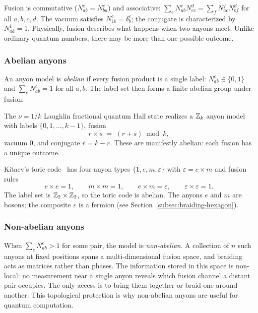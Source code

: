 \noindent
Fusion is commutative ($N^c_{ab} = N^c_{ba}$) and associative:
$\sum_e N^e_{ab} N^d_{ec} = \sum_f N^f_{ac} N^d_{bf}$ for all $a,b,c,d$.
The vacuum satisfies $N^c_{1b} = \delta^c_b$; the conjugate is characterized
by $N^1_{a\bar{a}} = 1$.  Physically, fusion describes what happens when two
anyons meet.  Unlike ordinary quantum numbers, there may be more than one
possible outcome.

\subsubsection*{Abelian anyons}

An anyon model is \emph{abelian} if every fusion product is a single label:
$N^c_{ab} \in \{0,1\}$ and $\sum_c N^c_{ab} = 1$ for all $a,b$.
The label set then forms a finite abelian group under fusion.

\begin{example}
\label{ex:zk-anyons}
The $\nu = 1/k$ Laughlin fractional quantum Hall state realizes a $\mathbb{Z}_k$ anyon
model with labels $\{0, 1, \ldots, k-1\}$, fusion
\begin{equation}
\label{eq:zk-fusion}
    r \times s \;=\; (r + s) \bmod k,
\end{equation}
vacuum $0$, and conjugate $\bar{r} = k - r$.  These are manifestly abelian:
each fusion has a unique outcome.
\end{example}

\begin{example}
\label{ex:toric-code-anyons}
Kitaev's toric code~\cite{Kitaev2003FaultTolerant} has four anyon types
$\{1, e, m, \varepsilon\}$ with $\varepsilon = e \times m$ and fusion rules
\begin{equation}
\label{eq:toric-fusion}
    e \times e = 1, \qquad m \times m = 1, \qquad e \times m = \varepsilon,
    \qquad \varepsilon \times \varepsilon = 1.
\end{equation}
The label set is $\mathbb{Z}_2 \times \mathbb{Z}_2$, so the toric code is abelian.
The anyons $e$ and $m$ are bosons; the composite $\varepsilon$ is a fermion
(see Section~\ref{subsec:braiding-hexagon}).
\end{example}

\subsubsection*{Non-abelian anyons}

When $\sum_c N^c_{ab} > 1$ for some pair, the model is \emph{non-abelian}.
A collection of $n$ such anyons at fixed positions spans a multi-dimensional
fusion space, and braiding acts as matrices rather than phases.  The
information stored in this space is non-local: no measurement near a single
anyon reveals which fusion channel a distant pair occupies.  The only access
is to bring them together or braid one around another.  This topological
protection is why non-abelian anyons are useful for quantum computation.

